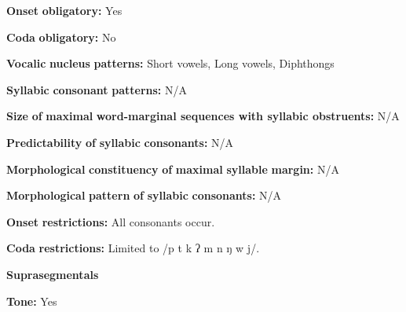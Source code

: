 \begin{styleBody}
\textbf{Onset} \textbf{obligatory:} Yes
\end{styleBody}

\begin{styleBody}
\textbf{Coda} \textbf{obligatory:} No
\end{styleBody}

\begin{styleBody}
\textbf{Vocalic} \textbf{nucleus} \textbf{patterns:} Short vowels, Long vowels, Diphthongs
\end{styleBody}

\begin{styleBody}
\textbf{Syllabic} \textbf{consonant} \textbf{patterns:} N/A
\end{styleBody}

\begin{styleBody}
\textbf{Size} \textbf{of} \textbf{maximal} \textbf{word{}-marginal sequences with syllabic obstruents:} N/A
\end{styleBody}

\begin{styleBody}
\textbf{Predictability} \textbf{of} \textbf{syllabic} \textbf{consonants:} N/A
\end{styleBody}

\begin{styleBody}
\textbf{Morphological} \textbf{constituency} \textbf{of} \textbf{maximal} \textbf{syllable} \textbf{margin:} N/A
\end{styleBody}

\begin{styleBody}
\textbf{Morphological} \textbf{pattern} \textbf{of} \textbf{syllabic} \textbf{consonants:} N/A
\end{styleBody}

\begin{styleBody}
\textbf{Onset} \textbf{restrictions:} All consonants occur. 
\end{styleBody}

\begin{styleBody}
\textbf{Coda} \textbf{restrictions:} Limited to /p t k ʔ m n ŋ w j/.
\end{styleBody}

\begin{styleBody}
\textbf{Suprasegmentals}
\end{styleBody}

\begin{styleBody}
\textbf{Tone:} Yes
\end{styleBody}

